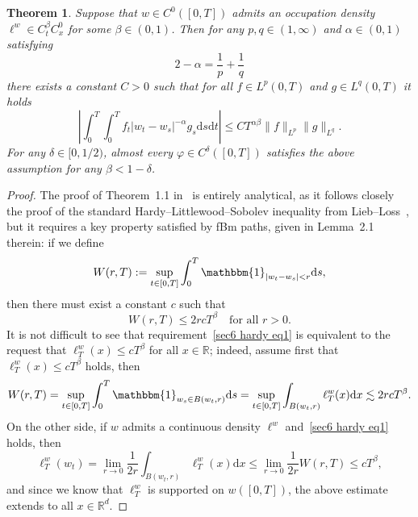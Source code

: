 \documentclass[10pt]{article}
\newcommand{\assign}{:=}
\newcommand{\mathd}{\mathrm{d}}
\newtheorem{theorem}{Theorem}%
\begin{document}
\begin{theorem}
  \label{sec6 thm hardy}Suppose that $w \in C^0 ([0, T])$ admits an occupation
  density $\ell^w \in C^{\beta}_t C^0_x$ for some $\beta \in (0, 1)$. Then for
  any $p, q \in (1, \infty)$ and $\alpha \in (0, 1)$ satisfying
  \[ 2 - \alpha = \frac{1}{p} + \frac{1}{q} \]
  there exists a constant $C > 0$ such that for all $f \in L^p (0, T)$ and $g
  \in L^q (0, T)$ it holds
  \[ \left| \int_0^T \int_0^T f_t  | w_t - w_s |^{- \alpha} g_s \mathd s
     \mathd t \right| \leqslant C T^{\alpha \beta}  \| f \|_{L^p} \| g
     \|_{L^q} . \]
  For any $\delta \in [0, 1 / 2)$, almost every $\varphi \in C^{\delta} ([0,
  T])$ satisfies the above assumption for any $\beta < 1 - \delta$.
\end{theorem}

\begin{proof}
  The proof of Theorem~1.1 in~{\cite{duboscq}} is entirely analytical, as it
  follows closely the proof of the standard Hardy--Littlewood--Sobolev
  inequality from Lieb--Loss~{\cite{lieb}}, but it requires a key property
  satisfied by fBm paths, given in Lemma~2.1 therein: if we define
  \[ W (r, T) \assign \sup_{t \in [0, T]} \int_0^T \mathbbm{1}_{| w_t - w_s |
     < r} \mathd s, \]
  then there must exist a constant $c$ such that
  \begin{equation}
    W (r, T) \leqslant 2 r c T^{\beta} \quad \text{for all } r > 0.
    \label{sec6 hardy eq1}
  \end{equation}
  It is not difficult to see that requirement~\eqref{sec6 hardy eq1} is
  equivalent to the request that $\ell^w_T (x) \leqslant c T^{\beta}$ for all
  $x \in \mathbb{R}$; indeed, assume first that $\ell^w_T (x) \leqslant c
  T^{\beta}$ holds, then
  \[ W (r, T) = \sup_{t \in [0, T]} \int_0^T \mathbbm{1}_{w_s \in B (w_t, r)}
     \mathd s = \sup_{t \in [0, T]} \int_{B (w_t, r)} \ell^w_T (x) \mathd x
     \lesssim 2 r c T^{\beta} . \]
  On the other side, if $w$ admits a continuous density $\ell^w$
  and~\eqref{sec6 hardy eq1} holds, then
  \[ \ell^w_T (w_t) = \lim_{r \rightarrow 0} \frac{1}{2 r} \int_{B (w_t, r)}
     \ell^w_T (x) \mathd x \leqslant \lim_{r \rightarrow 0} \frac{1}{2 r} W
     (r, T) \leqslant c T^{\beta}, \]
  and since we know that $\ell^w_T$ is supported on $w ([0, T])$, the above
  estimate extends to all $x \in \mathbb{R}^d$.
  

\end{proof}
\end{document}
